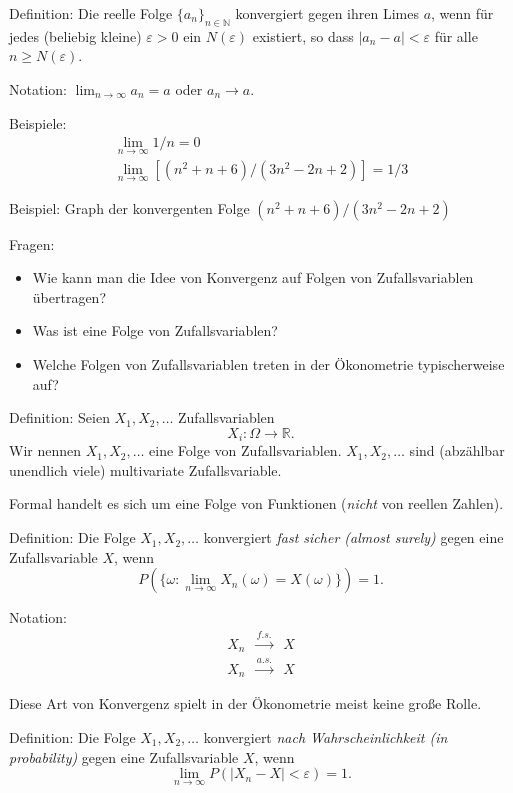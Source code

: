 \documentclass{article}
\begin{document}
Definition: Die reelle Folge $\{a_{n}\}_{n\in \mathbb{N}}$
konvergiert gegen ihren Limes $a$, wenn für jedes (beliebig kleine) $\varepsilon >0$
ein $N(\varepsilon)$ existiert, so dass $|a_{n}-a|<\varepsilon $ für
alle $n\geq N(\varepsilon)$.

Notation: $\lim_{n\rightarrow \infty}a_{n}=a$ oder $a_{n}\rightarrow a$.

Beispiele:
\begin{equation*}
\begin{array}{l}
\lim_{n\rightarrow \infty }1/n=0 \\ 
\lim_{n\rightarrow \infty }\left[(n^2+n+6) /(3n^2-2n+2) \right] =1/3
\end{array}
\end{equation*}

Beispiel: Graph der konvergenten Folge $(n^{2}+n+6)/(3n^{2}-2n+2)$

Fragen:
\begin{itemize}
	\item Wie kann man die Idee von Konvergenz auf Folgen von
	Zufallsvariablen übertragen?
	\item Was ist eine Folge von Zufallsvariablen?
	\item Welche Folgen von Zufallsvariablen treten in der
	Ökonometrie typischerweise auf?
\end{itemize}

Definition: Seien $X_{1},X_{2},\ldots $ Zufallsvariablen
\[ X_i:\Omega \rightarrow \mathbb{R}. \]
Wir nennen $X_{1},X_{2},\ldots $ eine Folge von Zufallsvariablen.
$X_{1},X_{2},\ldots $ sind (abzählbar unendlich viele) multivariate
Zufallsvariable.

Formal handelt es sich um eine Folge von Funktionen
(\emph{nicht} von reellen Zahlen).

Definition: Die Folge $X_{1},X_{2},\ldots $ konvergiert \emph{fast sicher
	(almost surely)} gegen eine Zufallsvariable $X$, wenn
\[ P(\{\omega :\lim_{n\rightarrow \infty }X_{n}(\omega)=X(\omega)\}) =1. \]

Notation:
\begin{eqnarray*}
	X_{n} &\overset{f.s.}{\rightarrow }&X \\
	X_{n} &\overset{a.s.}{\rightarrow }&X
\end{eqnarray*}

Diese Art von Konvergenz spielt in der Ökonometrie meist keine große Rolle.

Definition: Die Folge $X_{1},X_{2},\ldots $ konvergiert \emph{nach Wahrscheinlichkeit (in probability)}
gegen eine Zufallsvariable $X$, wenn
\[ \lim_{n\rightarrow \infty }P\left( |X_{n}-X|<\varepsilon \right) =1. \]
\end{document}
